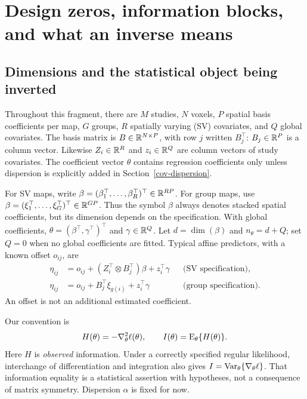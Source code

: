 \section{Design zeros, information blocks, and what an inverse means}
\label{cov-structure}

\subsection{Dimensions and the statistical object being inverted}
\label{cov-dimensions}

Throughout this fragment, there are $M$ studies, $N$ voxels, $P$ spatial
basis coefficients per map, $G$ groups, $R$ spatially varying (SV)
covariates, and $Q$ global covariates.  The basis matrix is
$B\in\mathbb R^{N\times P}$, with row $j$ written $B_j^\top$:
$B_j\in\mathbb R^P$ is a column vector.  Likewise $Z_i\in\mathbb R^R$ and
$z_i\in\mathbb R^Q$ are column vectors of study covariates.  The coefficient
vector $\theta$ contains regression coefficients only unless dispersion
is explicitly added in Section~\ref{cov-dispersion}.

For SV maps, write
$\beta=(\beta_1^\top,\ldots,\beta_R^\top)^\top\in\mathbb R^{RP}$.
For group maps, use
$\beta=(\xi_1^\top,\ldots,\xi_G^\top)^\top\in\mathbb R^{GP}$.
Thus the symbol $\beta$ always denotes stacked spatial coefficients,
but its dimension depends on the specification.  With global coefficients,
$\theta=(\beta^\top,\gamma^\top)^\top$ and $\gamma\in\mathbb R^Q$.
Let $d=\dim(\beta)$ and $n_\theta=d+Q$; set $Q=0$ when no global
coefficients are fitted.  Typical affine predictors, with a known offset
$o_{ij}$, are
\begin{align}
 \eta_{ij}
 &=o_{ij}+(Z_i^\top\otimes B_j^\top)\beta+z_i^\top\gamma
 &&\text{(SV specification)},\\
 \eta_{ij}
 &=o_{ij}+B_j^\top\xi_{g(i)}+z_i^\top\gamma
 &&\text{(group specification)}.
\end{align}
An offset is not an additional estimated coefficient.

Our convention is
\begin{equation}
 H(\theta)=-\nabla_\theta^2\ell(\theta),\qquad
 I(\theta)=\operatorname{E}_\theta\{H(\theta)\}.
 \label{cov-information-convention}
\end{equation}
Here $H$ is \emph{observed} information.  Under a correctly specified
regular likelihood, interchange of differentiation and integration also
gives $I=\operatorname{Var}_\theta\{\nabla_\theta\ell\}$.  That information equality
is a statistical assertion with hypotheses, not a consequence of matrix
symmetry.  Dispersion $\alpha$ is fixed for now.

